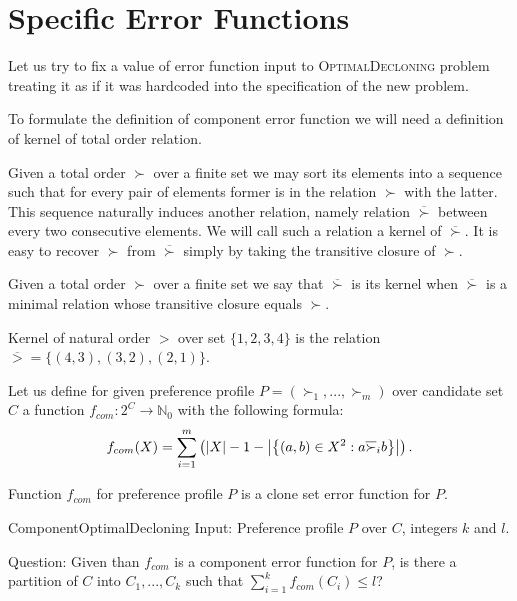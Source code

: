 \section{Specific Error Functions}

Let us try to fix a value of error function input to \textsc{OptimalDecloning} problem
treating it as if it was hardcoded into the specification of the new problem.



To formulate the definition of component error function we will need a definition of kernel of total order relation.

Given a total order $\succ$ over a finite set we may sort its elements into a sequence
such that for every pair of elements former is in the relation $\succ$ with the latter.
This sequence naturally induces another relation, namely relation $\overline{\succ}$
between every two consecutive elements.
We will call such a relation a kernel of $\overline{\succ}$.
It is easy to recover $\succ$ from $\overline{\succ}$ simply by taking the transitive closure of $\succ$.

\begin{defn}
Given a total order $\succ$ over a finite set we say that $\overline{\succ}$ is its kernel when
$\overline{\succ}$ is a minimal relation whose transitive closure equals $\succ$.
\end{defn}

\begin{exmp}
Kernel of natural order $>$ over set $\{1,2,3,4\}$ is the relation
$\overline{>} = \{(4,3), (3,2), (2,1)\}$.
\end{exmp}

\begin{defn}
Let us define for given preference profile $P = (\succ_1, ..., \succ_m)$ over candidate set $C$
a function $f_{com}: 2^C \rightarrow \mathbb{N}_0$ with the following formula:
$$ f_{com}(X) = \sum_{i=1}^m \left( \left\vert X \right\vert-1 -
\left\vert \left\lbrace \left( a,b \right) \in X^2 : a \overline{\succ}_i b \right\rbrace  \right\vert
\right) \text{.}$$
\end{defn}

\begin{rmrk}
Function $f_{com}$ for preference profile $P$ is a clone set error function for $P$.
\end{rmrk}

\begin{problem}{ComponentOptimalDecloning}
	Input: Preference profile $P$ over $C$, integers $k$ and $l$.

	Question: Given than $f_{com}$ is a component error function for $P$,
		is there a partition of $C$ into $C_1, ..., C_k$ such that $\sum_{i=1}^k f_{com}(C_i) \leq l$?
\end{problem}


